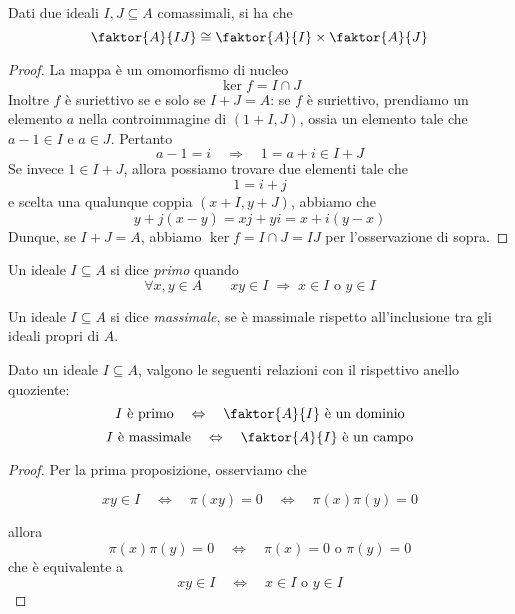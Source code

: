 \begin{multicols}{2}
\begin{theorem}
	Dati due ideali $ I, J \subseteq A $ comassimali, si ha che
	\[ \faktor{A}{IJ} \cong \faktor{A}{I} \times \faktor{A}{J} \]
\end{theorem}
\begin{proof}
	La mappa
	è un omomorfismo di nucleo
	\[ \ker f = I \cap J \]
	Inoltre $ f $ è suriettivo se e solo se $ I + J = A $: se $ f $ è suriettivo, prendiamo un elemento $ a $ nella controimmagine di $ (1 + I, J) $, ossia un elemento tale che 
	$ a-1 \in I $ e $ a \in J $.
	Pertanto 
	\[ a-1 = i \quad\Rightarrow\quad 1 = a + i \in I + J \]
	Se invece $ 1 \in I + J $, allora possiamo trovare due elementi tale che \[ 1 = i + j \]
	e scelta una qualunque coppia $ (x + I, y + J) $, abbiamo che
	\[ y + j(x-y) = xj + yi = x + i(y-x) \]
	Dunque, se $ I + J = A $, abbiamo $ \ker f = I \cap J = IJ $ per l'osservazione di sopra.
\end{proof}

\begin{definition}
	Un ideale $ I \subseteq A $ si dice \emph{primo} quando
	\[ \forall x, y \in A \qquad xy \in I \;\Rightarrow\; x \in I \text{ o } y \in I \]
\end{definition}

\begin{definition}
	Un ideale $ I \subseteq A $ si dice \emph{massimale}, se è massimale rispetto all'inclusione tra gli ideali propri di $ A $.
\end{definition}

\begin{theorem}\label{idealequoziente}
	Dato un ideale $ I \subseteq A $, valgono le seguenti relazioni con il rispettivo anello quoziente:
	\[ I \text{ è primo} \quad\Leftrightarrow\quad \faktor{A}{I} \text{ è  un dominio} \]
	\[ I \text{ è massimale} \quad\Leftrightarrow\quad \faktor{A}{I} \text{ è un campo} \]
\end{theorem}

\begin{proof}
	Per la prima proposizione, osserviamo che
	
	\[xy \in I \quad\Leftrightarrow\quad \pi(xy) = 0 
	\quad\Leftrightarrow\quad \pi(x)\pi(y) = 0 \]
	
	allora
	\[ \pi(x)\pi(y) = 0 \quad\Leftrightarrow\quad \pi(x) =0 \text{ o } \pi(y) = 0   \]
	che è equivalente a 
	\[ xy \in I \quad\Leftrightarrow\quad x \in I \text{ o } y \in I  \]
	

\end{proof}
\end{multicols}
